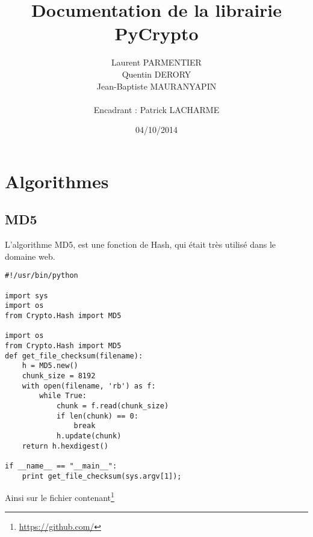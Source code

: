 \documentclass[a4paper, 12pt]{report}
\title{\bf{Documentation de la librairie PyCrypto}}
\author{Laurent PARMENTIER\\ Quentin DERORY\\ Jean-Baptiste MAURANYAPIN \\ \\ Encadrant : Patrick LACHARME}
\date{04/10/2014}
\begin{document}
\maketitle

\tableofcontents

\chapter{Algorithmes}

\section{MD5}

L'algorithme MD5, est une fonction de Hash, qui était très utilisé dans le domaine web.

\begin{lstlisting}
#!/usr/bin/python 

import sys
import os
from Crypto.Hash import MD5

import os
from Crypto.Hash import MD5
def get_file_checksum(filename):
    h = MD5.new()
    chunk_size = 8192 
    with open(filename, 'rb') as f:
        while True:
            chunk = f.read(chunk_size)
            if len(chunk) == 0:
                break
            h.update(chunk)
    return h.hexdigest()

if __name__ == "__main__":
    print get_file_checksum(sys.argv[1]);
\end{lstlisting}

Ainsi sur le fichier contenant\footnote{\url{https://github.com/}}
\end{document}
